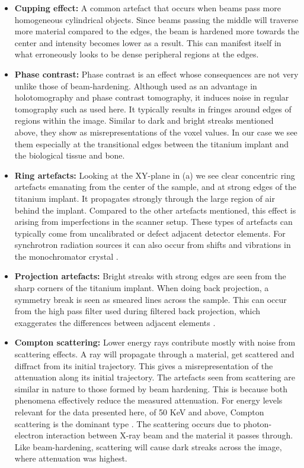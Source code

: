 \documentclass[pdflatex,sn-mathphys]{sn-jnl}%
\theoremstyle{thmstyleone}%
\theoremstyle{thmstyletwo}%
\theoremstyle{thmstylethree}%
\begin{document}
\begin{itemize}
\item \textbf{Cupping effect:} A common artefact that occurs when beams pass more homogeneous
cylindrical objects. Since beams passing the middle will traverse more material compared to the
edges, the beam is hardened more towards the center and intensity becomes lower as a result. This
can manifest itself in what erroneously looks to be dense peripheral regions at the edges.

\item \textbf{Phase contrast:} Phase contrast is an effect whose consequences are not very unlike those
of beam-hardening.  Although used as an advantage in holotomography\citep{holotomography} and phase
contrast tomography\citep{phasecontrast}, it induces noise in regular tomography such as used here.
It typically results in fringes around edges of regions within the image\citep{srnoise}. Similar to
dark and bright streaks mentioned above, they show as misrepresentations of the voxel values. In our
case we see them especially at the transitional edges between the titanium implant and the
biological tissue and bone.

\item \textbf{Ring artefacts:} Looking at the XY-plane in (a) we see clear concentric ring
artefacts emanating from the center of the sample, and at strong edges of the titanium implant. It
propagates strongly through the large region of air behind the implant. Compared to the other
artefacts mentioned, this effect is arising from imperfections in the scanner setup. These types of
artefacts can typically come from uncalibrated or defect adjacent detector elements. For synchrotron
radiation sources it can also occur from shifts and vibrations in the monochromator crystal
\citep{ringartefacts}.

\item \textbf{Projection artefacts:} Bright streaks with strong edges are seen from the sharp corners of
the titanium implant. When doing back projection, a symmetry break is seen as smeared lines across
the sample. This can occur from the high pass filter used during filtered back projection, which
exaggerates the differences between adjacent elements \citep{ctnoise}.

\item \textbf{Compton scattering:} Lower energy rays contribute mostly with noise from scattering
effects. A ray will propagate through a material, get scattered and diffract from its initial
trajectory. This gives a misrepresentation of the attenuation along its initial trajectory. The
artefacts seen from scattering are similar in nature to those formed by beam hardening. This is
because both phenomena effectively reduce the measured attenuation. For energy levels relevant for
the data presented here, of 50 KeV and above, Compton scattering is the dominant type
\citep{Compton}.  The scattering occurs due to photon-electron interaction between X-ray beam and
the material it passes through. Like beam-hardening, scattering will cause dark streaks across the
image, where attenuation was highest.
\end{itemize}
\end{document}
